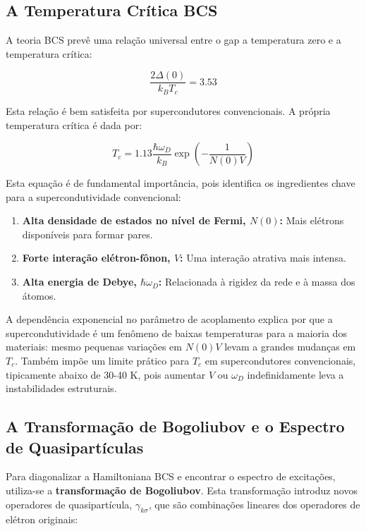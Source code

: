 \documentclass[12pt, a4paper, oneside]{report}
\begin{document}
\subsection{A Temperatura Crítica BCS}

A teoria BCS prevê uma relação universal entre o gap a temperatura zero e a temperatura crítica:

\begin{equation}
    \frac{2\Delta(0)}{k_B T_c} = 3.53
\end{equation}

Esta relação é bem satisfeita por supercondutores convencionais. A própria temperatura crítica é dada por:

\begin{equation}
    T_c = 1.13 \frac{\hbar \omega_D}{k_B} \exp\left(-\frac{1}{N(0)V}\right)
\end{equation}

Esta equação é de fundamental importância, pois identifica os ingredientes chave para a supercondutividade convencional:
\begin{enumerate}
    \item \textbf{Alta densidade de estados no nível de Fermi, $N(0)$:} Mais elétrons disponíveis para formar pares.
    \item \textbf{Forte interação elétron-fônon, $V$:} Uma interação atrativa mais intensa.
    \item \textbf{Alta energia de Debye, $\hbar \omega_D$:} Relacionada à rigidez da rede e à massa dos átomos.
\end{enumerate}

A dependência exponencial no parâmetro de acoplamento explica por que a supercondutividade é um fenômeno de baixas temperaturas para a maioria dos materiais: mesmo pequenas variações em $N(0)V$ levam a grandes mudanças em $T_c$. Também impõe um limite prático para $T_c$ em supercondutores convencionais, tipicamente abaixo de 30-40 K, pois aumentar $V$ ou $\omega_D$ indefinidamente leva a instabilidades estruturais.

\subsection{A Transformação de Bogoliubov e o Espectro de Quasipartículas}

Para diagonalizar a Hamiltoniana BCS e encontrar o espectro de excitações, utiliza-se a \textbf{transformação de Bogoliubov}. Esta transformação introduz novos operadores de quasipartícula, $\gamma_{k\sigma}$, que são combinações lineares dos operadores de elétron originais:
\end{document}
